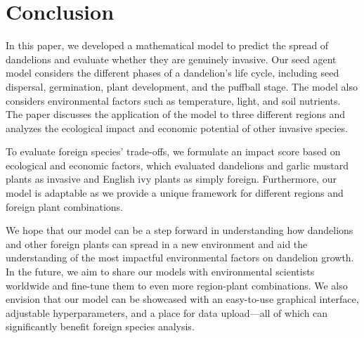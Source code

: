 \section{Conclusion}
In this paper, we developed a mathematical model to predict the spread of dandelions and evaluate whether they are genuinely invasive. Our seed agent model considers the different phases of a dandelion's life cycle, including seed dispersal, germination, plant development, and the puffball stage. The model also considers environmental factors such as temperature, light, and soil nutrients. The paper discusses the application of the model to three different regions and analyzes the ecological impact and economic potential of other invasive species.

To evaluate foreign species' trade-offs, we formulate an impact score based on ecological and economic factors, which evaluated dandelions and garlic mustard plants as invasive and English ivy plants as simply foreign. Furthermore, our model is adaptable as we provide a unique framework for different regions and foreign plant combinations. 

We hope that our model can be a step forward in understanding how dandelions and other foreign plants can spread in a new environment and aid the understanding of the most impactful environmental factors on dandelion growth. In the future, we aim to share our models with environmental scientists worldwide and fine-tune them to even more region-plant combinations. We also envision that our model can be showcased with an easy-to-use graphical interface, adjustable hyperparameters, and a place for data upload—all of which can significantly benefit foreign species analysis. 